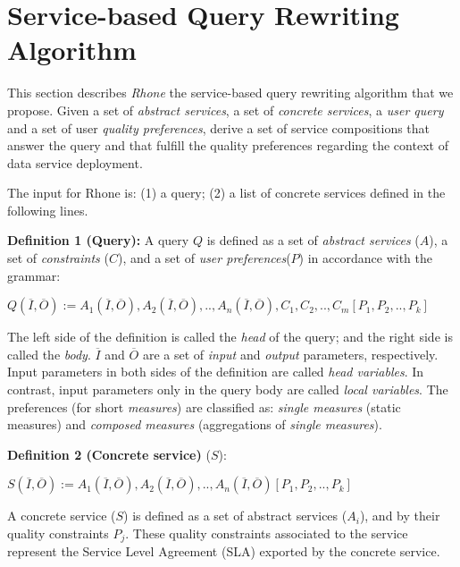 \section{Service-based Query Rewriting Algorithm}
\label{sec:rhone} 
This section describes \textit{Rhone} the service-based query rewriting algorithm that we propose. Given
a set of \textit{abstract services}, a set of \textit{concrete services}, a
\textit{user query} and a set of user \textit{quality preferences}, derive a set
of service compositions that answer the query and that fulfill the quality preferences
 regarding the context of data service deployment.

The  input for  Rhone  is: (1) a query; (2) a list of concrete services defined in the following lines.

\noindent \textbf{Definition 1 (Query):} 
A query $Q$ is defined as a set of \textit{abstract services} ($A$), a set of \textit{constraints} ($C$), and a set of \textit{user preferences}($P$) in accordance with the grammar: 

\begin{center}
$Q (\overline{I}, \overline{O}) := A_{1}(\overline{I}, \overline{O}), A_{2}(\overline{I}, \overline{O}), ..,  A_{n}(\overline{I}, \overline{O}),C_{1},C_{2}, .., C_{m}[P_{1},P_{2}, .., P_{k}]$
\end{center}  

The left side of the definition is called the \textit{head} of the query; and the right side is called the \textit{body}. 
$\overline{I}$ and $\overline{O}$ are a set of \textit{input} and \textit{output} parameters, respectively.
Input parameters in both sides of the definition are called \textit{head variables}.
In contrast, input parameters only in the query body are called \textit{local variables}.
The preferences (for short \textit{measures}) are classified as: \textit{single measures} (static measures) and \textit{composed measures} (aggregations of \textit{single measures}).
%

\noindent \textbf{Definition 2 (Concrete service)}  ($S$):
\begin{center}
$S (\overline{I}, \overline{O}) := A_{1}(\overline{I}, \overline{O}), A_{2}(\overline{I}, \overline{O}), ..,  A_{n}(\overline{I}, \overline{O})[P_{1},P_{2}, .., P_{k}]$
\end{center}  

A concrete service ($S$) is defined as a set of abstract services ($A_{i}$), and by their quality constraints $P_{j}$. 
These quality constraints associated to the service represent the Service Level Agreement (SLA) exported by the concrete service.

